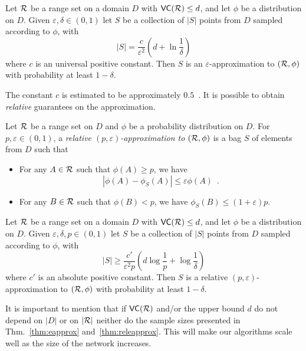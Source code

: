 \begin{theorem}\label{thm:eapprox}
  Let $\mathcal{R}$ be a range set on a domain $D$ with
  $\mathsf{VC}(\mathcal{R})\le d$, and let $\phi$ be a distribution on $D$. Given
  $\varepsilon,\delta\in(0,1)$ let $S$ be a collection of $|S|$ points from $D$
  sampled according to $\phi$, with
  \begin{equation}\label{eq:vceapprox}
	|S|=\frac{c}{\varepsilon^2}\left(d+\ln\frac{1}{\delta}\right)
  \end{equation}
  where $c$ is an universal positive constant. Then $S$ is an
  $\varepsilon$-approximation to $(\mathcal{R},\phi)$ with probability at least
  $1-\delta$.
\end{theorem}
The constant $c$ is estimated to be approximately $0.5$~\citep{LofflerP09}.
It is possible to obtain \emph{relative} guarantees on the approximation.
\begin{definition}\label{def:releapprox}
  Let $\mathcal{R}$ be a range set on $D$ and $\phi$ be a probability distribution on
  $D$. For $p,\varepsilon\in (0,1)$, a \emph{relative
  $(p,\varepsilon)$-approximation to $(\mathcal{R},\phi)$} is a bag $S$ of elements
  from $D$ such that 
  \begin{itemize}
    \item For any $A\in\mathcal{R}$ such that $\phi(A)\ge p$, we have 
      \[ |\phi(A) - \phi_S(A)|\le \varepsilon\phi(A)\enspace.\]
    \item For any $B\in\mathcal{R}$ such that $\phi(B)< p$, we have $\phi_S(B)\le
      (1+\varepsilon)p$.
  \end{itemize}
\end{definition}

\begin{theorem}\label{thm:releapprox}
  Let $\mathcal{R}$ be a range set on a domain $D$ with
  $\mathsf{VC}(\mathcal{R})\le d$, and let $\phi$ be a distribution on $D$. Given
  $\varepsilon,\delta,p\in(0,1)$ let $S$ be a collection of $|S|$ points from $D$
  sampled according to $\phi$, with 
  \begin{equation}\label{eq:releapprox}
    |S|\ge\frac{c'}{\varepsilon^2p}\left(d\log\frac{1}{p}+\log\frac{1}{\delta}\right)
  \end{equation}
  where $c'$ is an absolute positive constant. Then $S$ is a relative
  $(p,\varepsilon)$-approximation to $(\mathcal{R},\phi)$ with probability at least
  $1-\delta$.
\end{theorem}

It is important to mention that if $\mathsf{VC}(\mathcal{R})$ and/or the upper bound $d$ do
not depend on $|D|$ or on $|\mathcal{R}|$ neither do the sample sizes presented in
Thm.~\ref{thm:eapprox} and~\ref{thm:releapprox}. This will make our algorithms
scale well as the size of the network increases.

